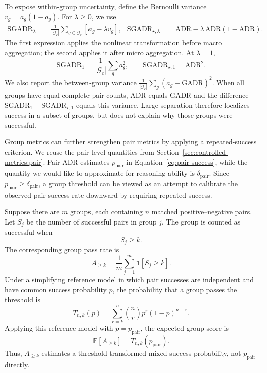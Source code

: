\documentclass[acmsmall,screen,review,anonymous]{acmart}
\begin{document}
To expose within-group uncertainty, define the Bernoulli variance
\(v_g=a_g(1-a_g)\). For \(\lambda\ge0\), we use
\begin{align}
\mathrm{SGADR}_{\lambda}
&=
\frac{1}{|\mathcal{G}_{c}|}
\sum_{g\in\mathcal{G}_{c}}
\left[a_g-\lambda v_g\right],
&
\mathrm{SGADR}_{\star,\lambda}
&=
\mathrm{ADR}
-\lambda\,\mathrm{ADR}(1-\mathrm{ADR}).
\label{eq:group-adr-lambda}
\end{align}
The first expression applies the nonlinear transformation before macro
aggregation; the second applies it after micro aggregation. At
\(\lambda=1\),
\begin{equation}
\mathrm{SGADR}_{1}
=\frac{1}{|\mathcal{G}_{c}|}\sum_g a_g^2,
\qquad
\mathrm{SGADR}_{\star,1}=\mathrm{ADR}^2.
\label{eq:group-adr-square-order}
\end{equation}
We also report the between-group variance
\(\frac{1}{|\mathcal{G}_{c}|}\sum_g(a_g-\mathrm{GADR})^2\). When all
groups have equal complete-pair counts, ADR equals GADR and the difference
\(\mathrm{SGADR}_{1}-\mathrm{SGADR}_{\star,1}\) equals this variance.
Large separation therefore localizes success in a subset of groups, but does
not explain why those groups were successful.

Group metrics can further strengthen pair metrics by applying a
repeated-success criterion. We reuse the pair-level quantities from
Section~\ref{sec:controlled-metrics:pair}. Pair ADR estimates
\(p_{\mathrm{pair}}\) in Equation~\eqref{eq:pair-success}, while the
quantity we would like to approximate for reasoning ability is
\(\delta_{\mathrm{pair}}\). Since
\(p_{\mathrm{pair}}\ge \delta_{\mathrm{pair}}\), a group threshold can be
viewed as an attempt to calibrate the observed pair success rate downward by
requiring repeated success.

Suppose there are \(m\) groups, each containing \(n\) matched
positive--negative pairs. Let \(S_j\) be the number of successful pairs in
group \(j\). The group is counted as successful when
\[
S_j\ge k.
\]
The corresponding group pass rate is
\begin{equation}
A_{\ge k}
=
\frac{1}{m}
\sum_{j=1}^{m}\mathbf{1}[S_j\ge k].
\label{eq:group-adr-at-least-k}
\end{equation}
Under a simplifying reference model in which pair successes are independent
and have common success probability \(p\), the probability that a group
passes the threshold is
\[
T_{n,k}(p)
=
\sum_{r=k}^{n}
\binom{n}{r}
p^r(1-p)^{n-r}.
\]
Applying this reference model with \(p=p_{\mathrm{pair}}\), the expected
group score is
\[
\mathbb{E}\!\left[A_{\ge k}\right]
=
T_{n,k}(p_{\mathrm{pair}}).
\]
Thus, \(A_{\ge k}\) estimates a threshold-transformed mixed success probability,
not \(p_{\mathrm{pair}}\) directly.
\end{document}
